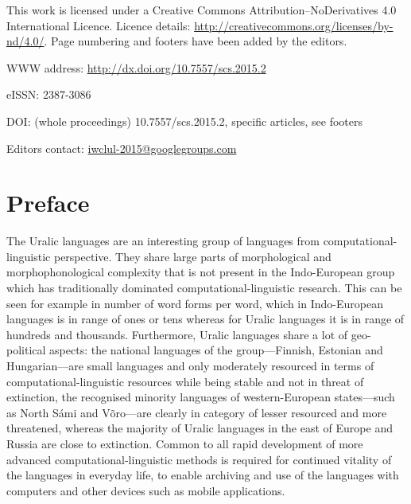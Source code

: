 \documentclass[b5paper]{book}
\newcommand\thedoi{10.7557/scs.2015.2}
\begin{document}
\frontmatter

\cleardoublepage
\thispagestyle{empty}
{\centering{}}

This work is licensed under a Creative Commons Attribution–NoDerivatives
4.0 International Licence.  Licence details:
\url{http://creativecommons.org/licenses/by-nd/4.0/}. Page numbering and
footers have been added by the editors.

WWW address: \url{http://dx.doi.org/10.7557/scs.2015.2}

eISSN: 2387-3086

DOI: (whole proceedings) 10.7557/scs.2015.2, specific articles, see footers

Editors contact: \url{iwclul-2015@googlegroups.com}

\clearpage

\renewcommand\thedoi{10.7557/5.3452}

\pagestyle{fancy}

\chapter*{Preface}

The Uralic languages are an interesting group of languages from
computational-linguistic perspective. They share large parts of morphological
and morphophonological complexity that is not present in the Indo-European
group which has traditionally dominated computational-linguistic research. This
can be seen for example in number of word forms per word, which in
Indo-European languages is in range of ones or tens whereas for Uralic
languages it is in range of hundreds and thousands. Furthermore, Uralic
languages share a lot of geo-political aspects: the national languages of the
group---Finnish, Estonian and Hungarian---are small languages and only
moderately resourced in terms of computational-linguistic resources while being
stable and not in threat of extinction, the recognised minority languages of
western-European states---such as North Sámi and Võro---are clearly in category
of lesser resourced and more threatened, whereas the majority of Uralic
languages in the east of Europe and Russia are close to extinction. Common to
all rapid development of more advanced computational-linguistic methods is
required for continued vitality of the languages in everyday life, to enable
archiving and use of the languages with computers and other devices such as
mobile applications.
\end{document}
